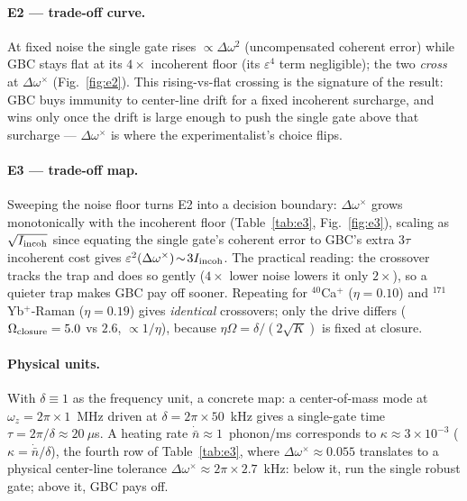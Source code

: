 \documentclass[aps,prapplied,twocolumn,superscriptaddress,floatfix,nofootinbib]{revtex4-2}
\begin{document}
\paragraph{E2 --- trade-off curve.} At fixed noise the single gate rises $\propto\Delta\omega^2$
(uncompensated coherent error) while GBC stays flat at its $4\times$ incoherent floor (its
$\varepsilon^4$ term negligible); the two \emph{cross} at $\Delta\omega^\times$
(Fig.~\ref{fig:e2}). This rising-vs-flat crossing is the signature of the result: GBC buys
immunity to center-line drift for a fixed incoherent surcharge, and wins only once the drift is
large enough to push the single gate above that surcharge --- $\Delta\omega^\times$ is where the
experimentalist's choice flips.

\paragraph{E3 --- trade-off map.} Sweeping the noise floor turns E2 into a decision boundary:
$\Delta\omega^\times$ grows monotonically with the incoherent floor (Table~\ref{tab:e3},
Fig.~\ref{fig:e3}), scaling as $\sqrt{I_{\rm incoh}}$ since equating the single gate's coherent
error to GBC's extra $3\tau$ incoherent cost gives $\varepsilon^2(\Delta\omega^\times)\!\sim\!3I_{\rm incoh}$.
The practical reading: the crossover tracks the trap and does so gently ($4\times$ lower noise
lowers it only $2\times$), so a quieter trap makes GBC pay off sooner.
Repeating for ${}^{40}$Ca$^+$ ($\eta=0.10$) and ${}^{171}$Yb$^+$-Raman ($\eta=0.19$) gives
\emph{identical} crossovers; only the drive differs ($\Omega_{\rm closure}=5.0$ vs $2.6$,
$\propto1/\eta$), because $\eta\Omega=\delta/(2\sqrt K)$ is fixed at closure.

\paragraph*{Physical units.} With $\delta\equiv1$ as the frequency unit, a concrete map:
a center-of-mass mode at $\omega_z=2\pi\times1$~MHz driven at $\delta=2\pi\times50$~kHz gives a
single-gate time $\tau=2\pi/\delta\approx20~\mu$s. A heating rate $\dot{\bar n}\approx1$~phonon/ms
corresponds to $\kappa\approx3\times10^{-3}$ ($\kappa=\dot{\bar n}/\delta$), the fourth row of
Table~\ref{tab:e3}, where $\Delta\omega^\times\approx0.055$ translates to a physical center-line
tolerance $\Delta\omega^\times\approx2\pi\times2.7$~kHz: below it, run the single robust gate;
above it, GBC pays off.
\end{document}
